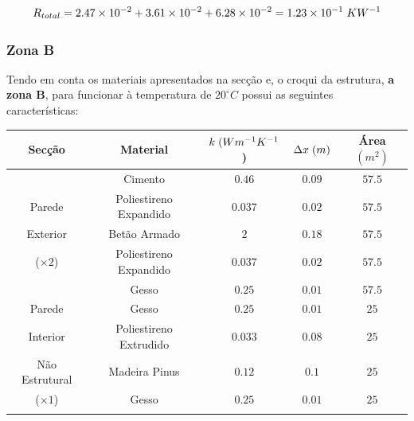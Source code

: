 \documentclass[12pt, a4paper]{article}
\begin{document}
\begin{equation}
	R_{total} =
		2.47 \times 10^{-2} + 3.61 \times 10^{-2} + 6.28 \times 10^{-2} = 1.23 \times 10^{-1} \hspace{1mm} KW^{-1}
	\label{eq:zona_a_total}
\end{equation}


\subsubsection{Zona B}\label{ssub:zonab}

Tendo em conta os materiais apresentados na secção e, o croqui da estrutura, \textbf{a zona B}, para funcionar
à temperatura de $ 20^\circ C $ possui as seguintes características:

\begin{table}[htpb]
	\begin{center}
		\begin{tabular}{c c c c c}
			\toprule{}
			Secção                     & Material               & $ k \hspace{1mm} (Wm^{-1}K^{-1}$) & $ \Delta x \hspace{1mm} (m)$ & Área $(m^2) $ \\
				\midrule{}

			\multirow{5}{*}{}          & Cimento                & $0.46$                            & $0.09$                       & $57.5$          \\
				\cline{2-5}
			Parede                     & Poliestireno Expandido & $0.037$                           & $0.02$                       & $57.5$          \\
				\cline{2-5}
			Exterior                   & Betão Armado           & $2$                               & $0.18$                       & $57.5$          \\
				\cline{2-5}
			($\times 2$)               & Poliestireno Expandido & $0.037$                           & $0.02$                       & $57.5$          \\
				\cline{2-5}
			                           & Gesso                  & $0.25$                            & $0.01$                       & $57.5$          \\
				\midrule{}

			Parede \multirow{4}{*}{}   & Gesso                  & $0.25$                            & $0.01$                       & $25$          \\
				\cline{2-5}
			Interior                   & Poliestireno Extrudido & $0.033$                           & $0.08$                       & $25$          \\
				\cline{2-5}
			Não Estrutural             & Madeira Pinus          & $0.12$                            & $0.1$                        & $25$          \\
				\cline{2-5}
			($\times 1$)               & Gesso                  & $0.25$                            & $0.01$                       & $25$          \\
				\midrule{}


\end{tabular}
\end{center}
\end{table}
\end{document}

